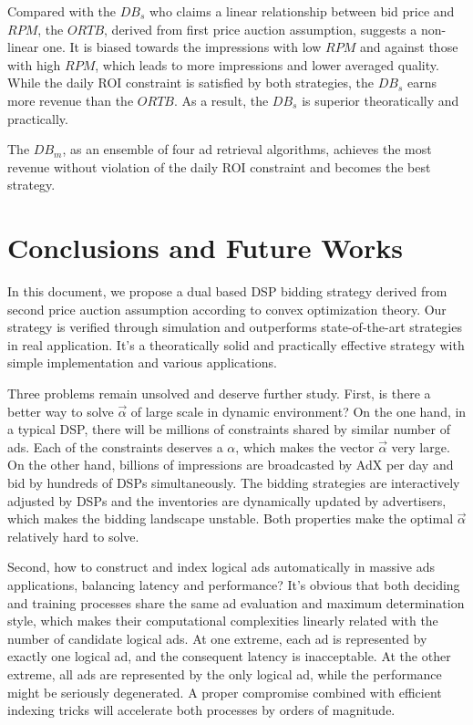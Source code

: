 \documentclass[sigconf]{acmart}
\newcommand{\valpha}{\vec{\alpha}}
\begin{document}
Compared with the $DB_s$ who claims a linear relationship between bid price and $RPM$,
    the $ORTB$, derived from first price auction assumption, suggests a non-linear one.
It is biased towards the impressions with low $RPM$ and against those with high $RPM$,
    which leads to more impressions and lower averaged quality.
While the daily ROI constraint is satisfied by both strategies,
    the $DB_s$ earns more revenue than the $ORTB$. As a result, the $DB_s$ is superior theoratically and practically.

The $DB_m$, as an ensemble of four ad retrieval algorithms,
    achieves the most revenue without violation of the daily ROI constraint and becomes the best strategy.

\section{Conclusions and Future Works}

In this document, we propose a dual based DSP bidding strategy
    derived from second price auction assumption according to convex optimization theory.
Our strategy is verified through simulation and outperforms state-of-the-art strategies in real application.
It's a theoratically solid and practically effective strategy with simple implementation and various applications.

Three problems remain unsolved and deserve further study.
First, is there a better way to solve $\valpha$ of large scale in dynamic environment?
On the one hand, in a typical DSP, there will be millions of constraints shared by similar number of ads.
Each of the constraints deserves a $\alpha$, which makes the vector $\valpha$ very large.
On the other hand, billions of impressions are broadcasted by AdX per day and bid by hundreds of DSPs simultaneously.
The bidding strategies are interactively adjusted by DSPs and the inventories are dynamically updated by advertisers,
    which makes the bidding landscape unstable.
Both properties make the optimal $\valpha$ relatively hard to solve.

Second, how to construct and index logical ads automatically in massive ads applications, balancing latency and performance?
It's obvious that both deciding and training processes share the same ad evaluation and maximum determination style,
    which makes their computational complexities linearly related with the number of candidate logical ads.
At one extreme, each ad is represented by exactly one logical ad, and the consequent latency is inacceptable.
At the other extreme, all ads are represented by the only logical ad, while the performance might be seriously degenerated.
A proper compromise combined with efficient indexing tricks will accelerate both processes by orders of magnitude.
\end{document}
